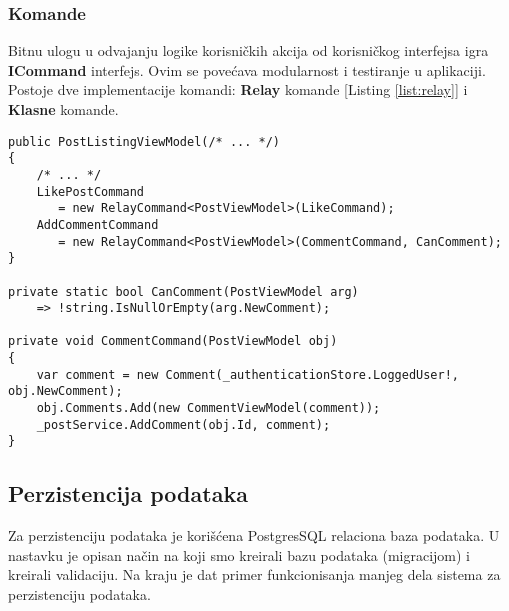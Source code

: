 \subsubsection*{Komande}
\par Bitnu ulogu u odvajanju logike korisničkih akcija od korisničkog interfejsa igra \textbf{ICommand} interfejs. Ovim se povećava modularnost i testiranje u 
aplikaciji. Postoje dve implementacije komandi: \textbf{Relay} komande [Listing \ref{list:relay}] i \textbf{Klasne} komande.  
\begin{lstlisting}[caption={Primer \textit{relay} komande za dodavanje komentara}, captionpos=b, label=list:relay]
public PostListingViewModel(/* ... */)
{
    /* ... */
    LikePostCommand 
       = new RelayCommand<PostViewModel>(LikeCommand);
    AddCommentCommand 
       = new RelayCommand<PostViewModel>(CommentCommand, CanComment);
}

private static bool CanComment(PostViewModel arg) 
    => !string.IsNullOrEmpty(arg.NewComment);

private void CommentCommand(PostViewModel obj)
{
    var comment = new Comment(_authenticationStore.LoggedUser!, obj.NewComment);
    obj.Comments.Add(new CommentViewModel(comment));
    _postService.AddComment(obj.Id, comment);
}
\end{lstlisting}
\subsection{Perzistencija podataka}
\par Za perzistenciju podataka je korišćena PostgresSQL relaciona baza podataka. U nastavku je opisan način na koji smo kreirali bazu podataka (migracijom)
i kreirali validaciju. Na kraju je dat primer funkcionisanja manjeg dela sistema za perzistenciju podataka.
